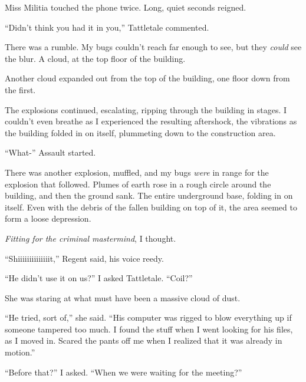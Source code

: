 Miss Militia touched the phone twice.  Long, quiet seconds reigned.



``Didn't think you had it in you,'' Tattletale commented.



There was a rumble.  My bugs couldn't reach far enough to see, but they \emph{could} see the blur.  A cloud, at the top floor of the building.



Another cloud expanded out from the top of the building, one floor down from the first.



The explosions continued, escalating, ripping through the building in stages.  I couldn't even breathe as I experienced the resulting aftershock, the vibrations as the building folded in on itself, plummeting down to the construction area.



``What-'' Assault started.



There was another explosion, muffled, and my bugs \emph{were} in range for the explosion that followed.  Plumes of earth rose in a rough circle around the building, and then the ground sank.  The entire underground base, folding in on itself.  Even with the debris of the fallen building on top of it, the area seemed to form a loose depression.



\emph{Fitting for the criminal mastermind}, I thought.



``Shiiiiiiiiiiiiiit,'' Regent said, his voice reedy.



``He didn't use it on us?'' I asked Tattletale.  ``Coil?''



She was staring at what must have been a massive cloud of dust.



``He tried, sort of,'' she said.  ``His computer was rigged to blow everything up if someone tampered too much.  I found the stuff when I went looking for his files, as I moved in.  Scared the pants off me when I realized that it was already in motion.''



``Before that?''  I asked.  ``When we were waiting for the meeting?''



